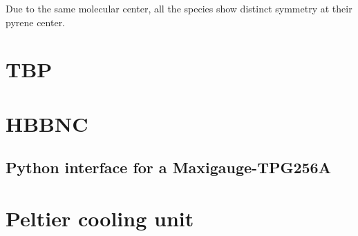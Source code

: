 \documentclass[
10pt,					%
a4paper,				%
twoside,				%
BCOR=8mm,				%
headings=normal,		%
headsepline,			%
footsepline,			%
plainfootsepline,		%
]{scrbook}
\begin{document}
Due to the same molecular center, all the species show distinct symmetry at their pyrene center. 
%
%
  
  
  
  
\restoregeometry
 \section{TBP}
 
% 
\section{HBBNC}
 
\begin{landscape}
	\section{Python interface for a Maxigauge-TPG256A}
\end{landscape}
\section{Peltier cooling unit}
 
\end{document}
